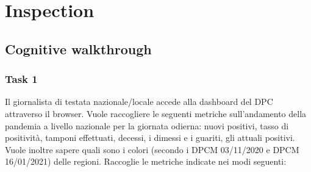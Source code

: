 \section{Inspection}
\label{s:inspection}

\subsection{Cognitive walkthrough}
\label{ss:cognitive-walkthrough}

\subsubsection{Task 1}
\label{sss:cw-task-1}
Il giornalista di testata nazionale/locale accede alla dashboard del DPC attraverso il browser.
Vuole raccogliere le seguenti metriche sull'andamento della pandemia a livello nazionale per la giornata odierna: nuovi positivi, tasso di positività, tamponi effettuati, decessi, i dimessi e i guariti, gli attuali positivi.
Vuole inoltre sapere quali sono i colori (secondo i DPCM 03/11/2020 e DPCM 16/01/2021) delle regioni.
Raccoglie le metriche indicate nei modi seguenti:
